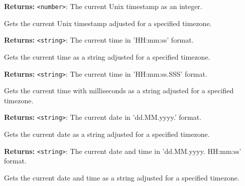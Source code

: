 \documentclass[12pt,a4paper]{article}
\begin{document}
\noindent \textbf{Returns:} \texttt{<number>}: The current Unix timestamp as an integer.

\noindent Gets the current Unix timestamp adjusted for a specified timezone.

\vspace{5mm}
\noindent {}


\noindent \textbf{Returns:} \texttt{<string>}: The current time in 'HH:mm:ss' format.

\noindent Gets the current time as a string adjusted for a specified timezone.

\vspace{5mm}
\noindent {}


\noindent \textbf{Returns:} \texttt{<string>}: The current time in 'HH:mm:ss.SSS' format.

\noindent Gets the current time with milliseconds as a string adjusted for a specified timezone.

\vspace{5mm}
\noindent {}


\noindent \textbf{Returns:} \texttt{<string>}: The current date in 'dd.MM.yyyy.' format.

\noindent Gets the current date as a string adjusted for a specified timezone.

\vspace{5mm}
\noindent {}


\noindent \textbf{Returns:} \texttt{<string>}: The current date and time in 'dd.MM.yyyy. HH:mm:ss' format.

\noindent Gets the current date and time as a string adjusted for a specified timezone.

\vspace{5mm}
\noindent {}
\end{document}
